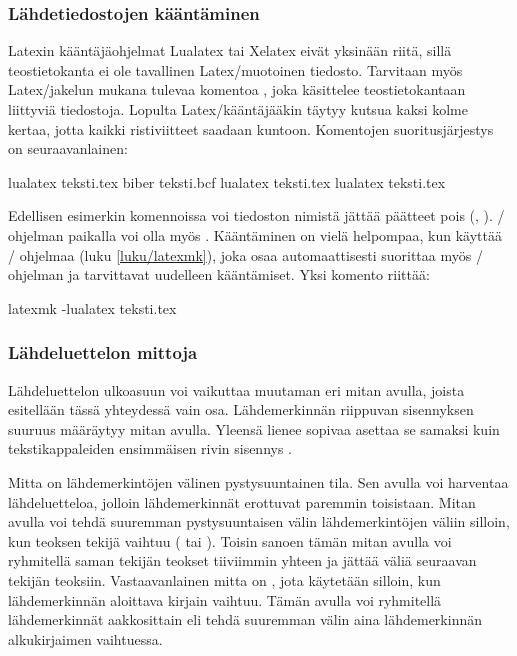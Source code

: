 \subsubsection{Lähdetiedostojen kääntäminen}

Latexin kääntäjäohjelmat Lualatex tai Xelatex eivät yksinään riitä,
sillä teostietokanta ei ole tavallinen Latex\-/muotoinen tiedosto.
Tarvitaan myös Latex\-/jakelun mukana tulevaa komentoa ,
joka käsittelee teostietokantaan liittyviä tiedostoja. Lopulta
Latex\-/kääntäjääkin täytyy kutsua kaksi kolme kertaa, jotta kaikki
ristiviitteet saadaan kuntoon. Komentojen suoritusjärjestys on
seuraavanlainen:

\begin{koodilohkosis}
lualatex teksti.tex
biber teksti.bcf
lualatex teksti.tex
lualatex teksti.tex
\end{koodilohkosis}

Edellisen esimerkin komennoissa voi tiedoston nimistä jättää päätteet
pois (, ). \-/ ohjelman paikalla
voi olla myös . Kääntäminen on vielä helpompaa, kun
käyttää \-/ ohjelmaa (luku \ref{luku/latexmk}), joka osaa
automaattisesti suorittaa myös \-/ ohjelman ja tarvittavat
uudelleen kääntämiset. Yksi komento riittää:

\begin{koodilohkosis}
latexmk -lualatex teksti.tex    %
\end{koodilohkosis}

\subsubsection{Lähdeluettelon mittoja}

Lähdeluettelon ulkoasuun voi vaikuttaa muutaman eri mitan avulla, joista
esitellään tässä yhteydessä vain osa. Lähdemerkinnän riippuvan
sisennyksen suuruus määräytyy mitan  avulla. Yleensä
lienee sopivaa asettaa se samaksi kuin tekstikappaleiden ensimmäisen
rivin sisennys .

\begin{koodilohkosis}
\setlength{\parindent}{1.1em} %
\setlength{\bibhang}{\parindent}
\end{koodilohkosis}

Mitta  on lähdemerkintöjen välinen pystysuuntainen
tila.  Sen avulla voi harventaa lähdeluetteloa,
jolloin lähdemerkinnät erottuvat paremmin toisistaan. Mitan
 avulla voi tehdä suuremman pystysuuntaisen välin
lähdemerkintöjen väliin silloin, kun teoksen tekijä vaihtuu
( tai ). Toisin sanoen tämän mitan avulla
voi ryhmitellä saman tekijän teokset tiiviimmin yhteen ja jättää väliä
seuraavan tekijän teoksiin. Vastaavanlainen mitta on
, jota käytetään silloin, kun lähdemerkinnän
aloittava kirjain vaihtuu. Tämän avulla voi ryhmitellä lähdemerkinnät
aakkosittain eli tehdä suuremman välin aina lähdemerkinnän alkukirjaimen
vaihtuessa.

